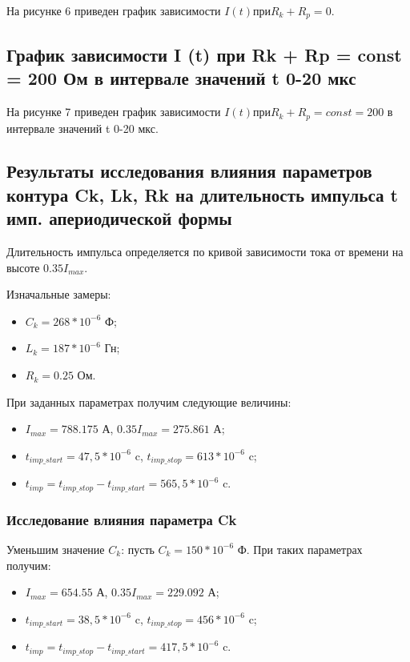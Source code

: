 На рисунке 6 приведен график зависимости $I(t) при R_k + R_p = 0$.



\subsection*{График зависимости I (t) при Rk + Rp = const = 200 Ом в интервале значений t 0-20 мкс}

На рисунке 7 приведен график зависимости $I(t) при R_k + R_p = const = 200$ в интервале значений t 0-20 мкс.



\subsection*{Результаты исследования влияния параметров контура Ck, Lk, Rk на длительность импульса t имп. апериодической формы}

Длительность импульса определяется по кривой зависимости тока от времени на высоте $0.35I_{max}$.

Изначальные замеры:
\begin{itemize}
	\item $C_k = 268 * 10^{-6}$ Ф;
	\item $L_k = 187 * 10^{-6} $ Гн;
	\item $R_k = 0.25$ Ом.
\end{itemize}


При заданных параметрах получим следующие величины:
\begin{itemize}
	\item $I_{max} = 788.175$ А, $0.35I_{max} = 275.861$ А;
	\item $t_{imp\_start} = 47,5 * 10^{-6}$ c, $t_{imp\_stop} = 613 * 10^{-6}$ c;
	\item $t_{imp} = t_{imp\_stop} - t_{imp\_start} = 565,5 * 10^{-6}$ c.
\end{itemize}


\subsubsection{Исследование влияния параметра Ck}

Уменьшим значение $C_k$: пусть $C_k = 150 * 10^{-6}$ Ф. При таких параметрах получим:
\begin{itemize}
	\item $I_{max} = 654.55$ А, $0.35I_{max} = 229.092$ А;
	\item $t_{imp\_start} = 38,5 * 10^{-6}$ c, $t_{imp\_stop} = 456 * 10^{-6}$ c;
	\item $t_{imp} = t_{imp\_stop} - t_{imp\_start} = 417,5 * 10^{-6}$ c.
\end{itemize}

